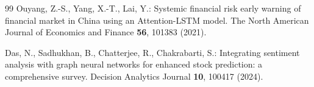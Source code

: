 \documentclass[runningheads]{llncs}
\begin{document}
\begin{thebibliography}{99}
Ouyang, Z.-S., Yang, X.-T., Lai, Y.: Systemic financial risk early warning of financial market in
China using an Attention-LSTM model.
The North American Journal of Economics and Finance \textbf{56}, 101383 (2021).

Das, N., Sadhukhan, B., Chatterjee, R., Chakrabarti, S.: Integrating sentiment analysis with graph
neural networks for enhanced stock prediction: a comprehensive survey.
Decision Analytics Journal \textbf{10}, 100417 (2024).

\end{thebibliography}
\end{document}
